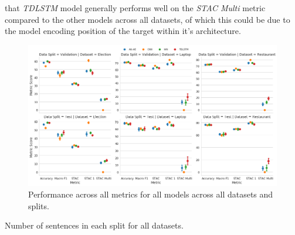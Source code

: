 that \textit{TDLSTM} model generally performs well on the \textit{STAC Multi} metric compared to the other models across all datasets, of which this could be due to the model encoding position of the target within it's architecture. 

\begin{figure}[ht!]
    \centering
    \includegraphics[scale=0.32]{images/augmentation/methods_performance/baseline/baseline_stac_scores.png}
    \caption{Performance across all metrics for all models across all datasets and splits.}
    \label{fig:baseline_stac_scores.png}
\end{figure}

\begin{table}[ht!]
    \centering
    
    \caption{Number of sentences in each split for all datasets.}
    \label{tab:aug_STAC_samples_stats}
\end{table}


